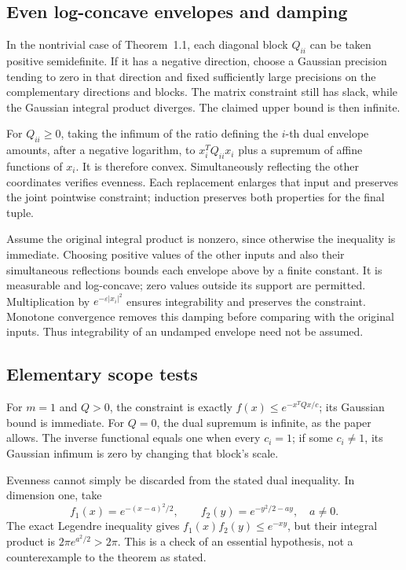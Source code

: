\documentclass[10pt]{article}
\begin{document}
\subsection*{Even log-concave envelopes and damping}
In the nontrivial case of Theorem 1.1, each diagonal block \(Q_{ii}\) can be taken positive semidefinite. If it has a negative direction, choose a Gaussian precision tending to zero in that direction and fixed sufficiently large precisions on the complementary directions and blocks. The matrix constraint still has slack, while the Gaussian integral product diverges. The claimed upper bound is then infinite.\par
For \(Q_{ii}\ge0\), taking the infimum of the ratio defining the \(i\)-th dual envelope amounts, after a negative logarithm, to \(x_i^TQ_{ii}x_i\) plus a supremum of affine functions of \(x_i\). It is therefore convex. Simultaneously reflecting the other coordinates verifies evenness. Each replacement enlarges that input and preserves the joint pointwise constraint; induction preserves both properties for the final tuple.\par
Assume the original integral product is nonzero, since otherwise the inequality is immediate. Choosing positive values of the other inputs and also their simultaneous reflections bounds each envelope above by a finite constant. It is measurable and log-concave; zero values outside its support are permitted. Multiplication by \(e^{-\varepsilon|x_i|^2}\) ensures integrability and preserves the constraint. Monotone convergence removes this damping before comparing with the original inputs. Thus integrability of an undamped envelope need not be assumed.\par
\subsection*{Elementary scope tests}
For \(m=1\) and \(Q>0\), the constraint is exactly \(f(x)\le e^{-x^TQx/c}\); its Gaussian bound is immediate. For \(Q=0\), the dual supremum is infinite, as the paper allows. The inverse functional equals one when every \(c_i=1\); if some \(c_i\ne1\), its Gaussian infimum is zero by changing that block’s scale.\par
Evenness cannot simply be discarded from the stated dual inequality. In dimension one, take \[f_1(x)=e^{-(x-a)^2/2},\qquad
 f_2(y)=e^{-y^2/2-ay},\quad a\ne0.\] The exact Legendre inequality gives \(f_1(x)f_2(y)\le e^{-xy}\), but their integral product is \(2\pi e^{a^2/2}>2\pi\). This is a check of an essential hypothesis, not a counterexample to the theorem as stated.\par
\end{document}
